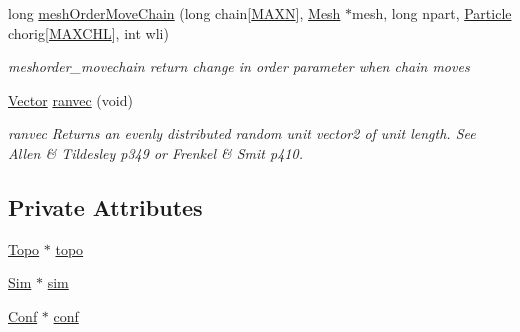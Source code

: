 \begin{DoxyCompactItemize}
long \hyperlink{class_move_creator_a46ef1e99782d3f335369fc178dc45d0f}{mesh\+Order\+Move\+Chain} (long chain\mbox{[}\hyperlink{macros_8h_ad1f79d9d99776d7353c6659c307c83c6}{M\+A\+X\+N}\mbox{]}, \hyperlink{class_mesh}{Mesh} $\ast$mesh, long npart, \hyperlink{class_particle}{Particle} chorig\mbox{[}\hyperlink{macros_8h_a6ba68031db49c489a6a5902f87b915c8}{M\+A\+X\+C\+H\+L}\mbox{]}, int wli)
\begin{DoxyCompactList}\small\item\em meshorder\+\_\+movechain return change in order parameter when chain moves \end{DoxyCompactList}\item 
\hyperlink{class_vector}{Vector} \hyperlink{class_move_creator_a6dad79041e592e9de8c30c82a4da6b1f}{ranvec} (void)
\begin{DoxyCompactList}\small\item\em ranvec Returns an evenly distributed random unit vector2 of unit length. See Allen \& Tildesley p349 or Frenkel \& Smit p410. \end{DoxyCompactList}\end{DoxyCompactItemize}
\subsection*{Private Attributes}
\begin{DoxyCompactItemize}
\item 
\hyperlink{struct_topo}{Topo} $\ast$ \hyperlink{class_move_creator_a34a03c3300543b9db3f7b03bb77027d3}{topo}
\item 
\hyperlink{struct_sim}{Sim} $\ast$ \hyperlink{class_move_creator_a75cae5ea1a390a8f3dc20e8870576404}{sim}
\item 
\hyperlink{class_conf}{Conf} $\ast$ \hyperlink{class_move_creator_ab8854d02b8ca0b270709909e2ed1fb27}{conf}
\end{DoxyCompactItemize}


